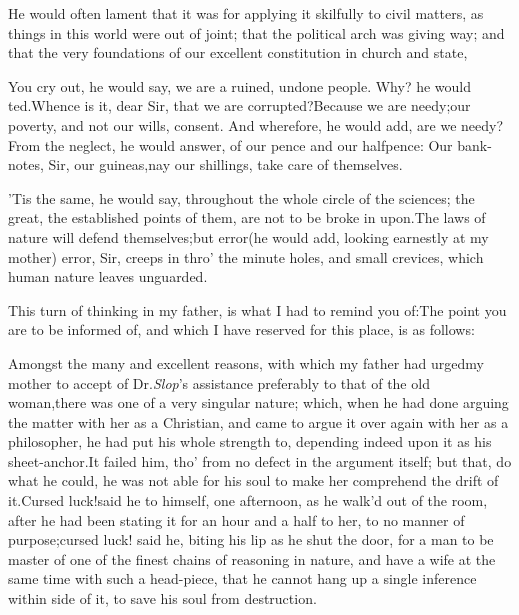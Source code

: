 \documentclass{article}
\begin{document}
He would often lament that it was for
applying it skilfully to civil matters, as  things in this world were
out of joint;\tsk\break
that the political arch was giving way;\tsk{}
and that the very foundations of our excellent constitution in
church and state, 

You cry out, he would say, we are a ruined, undone people.\tsk
Why? he would 
ted.\tsk Whence is it, dear Sir, that we are
corrupted?\tsk Because we are needy;\tsk our
poverty, and not our wills, consent.\tsk\break
And wherefore, he would add, are we needy?\tsk From the neglect, he would answer,
of our pence and our halfpence:\tsk\break
Our bank-notes, Sir, our guineas,\tsk nay our shillings,
take care of themselves.

’Tis the same, he would say, throughout the whole circle
of the sciences;\tsk{}
the great, the established points of them, are not to be broke
in upon.\tsk The laws of nature will defend themselves;\tsk but
error\tsk (he would add, looking earnestly at my mother)\tsk
error, Sir, creeps in thro’ the minute holes, and small
crevices, which human nature leaves unguarded.

This turn of thinking in my father, is what I had to remind you
of:\tsk The point you are to be informed of, and which I have
reserved for this place, is as follows:

Amongst the many and excellent reasons, with which my father had
urged\break my mother to accept of Dr.\@ \textit{Slop}’s as\-sistance
preferably to that of the old wo\-man,\tsk there was one of a very
singular nature; which, when he had done arguing the matter with
her as a Christian,\break
and came to argue it over again with her
as a philosopher, he had put his whole strength to, depending
indeed upon it as his sheet-anchor.\tsh It failed him, tho’ from
no defect in the argument itself; but that, do what he could, he
was not able for his soul to make her comprehend the drift of
it.\tsh Cursed luck!\tsh said he to himself, one afternoon, as
he walk’d out of the room, after he had been stating it for an
hour and a half to her, to no manner of purpose;\tsk cursed
luck! said he, biting his lip as he shut the door,\break
\tsk for a man
to be master of one of the finest chains of reasoning in
nature,\tsh\break
and have a wife at the same time with such a
head-piece, that he cannot hang up a single inference within
side of it, to save his soul from destruction.
\end{document}

